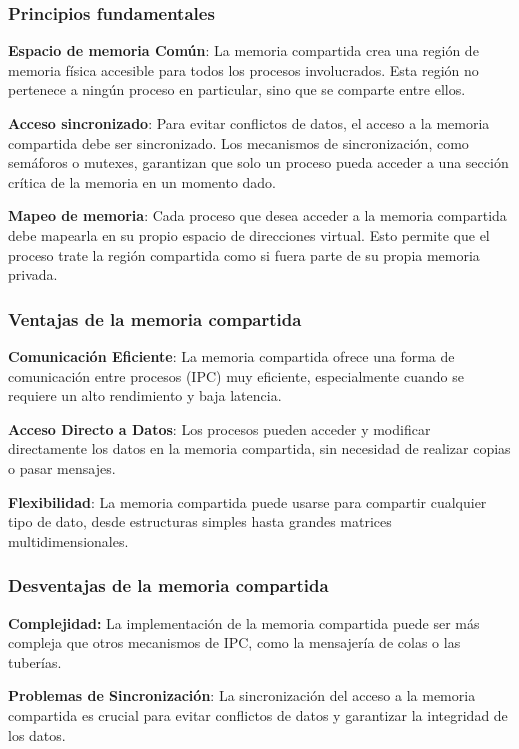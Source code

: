 \subsubsection{Principios fundamentales}

\textbf{Espacio de memoria Común}: La memoria compartida crea una región de memoria física accesible para todos los procesos involucrados. Esta región no pertenece a ningún proceso en particular, sino que se comparte entre ellos.

\textbf{Acceso sincronizado}: Para evitar conflictos de datos, el acceso a la memoria compartida debe ser sincronizado. Los mecanismos de sincronización, como semáforos o mutexes, garantizan que solo un proceso pueda acceder a una sección crítica de la memoria en un momento dado.

\textbf{Mapeo de memoria}: Cada proceso que desea acceder a la memoria compartida debe mapearla en su propio espacio de direcciones virtual. Esto permite que el proceso trate la región compartida como si fuera parte de su propia memoria privada.

\subsubsection{Ventajas de la memoria compartida}

\textbf{Comunicación Eficiente}: La memoria compartida ofrece una forma de comunicación entre procesos (IPC) muy eficiente, especialmente cuando se requiere un alto rendimiento y baja latencia.

\textbf{Acceso Directo a Datos}: Los procesos pueden acceder y modificar directamente los datos en la memoria compartida, sin necesidad de realizar copias o pasar mensajes.

\textbf{Flexibilidad}: La memoria compartida puede usarse para compartir cualquier tipo de dato, desde estructuras simples hasta grandes matrices multidimensionales.

\subsubsection{Desventajas de la memoria compartida}

\textbf{Complejidad:} La implementación de la memoria compartida puede ser más compleja que otros mecanismos de IPC, como la mensajería de colas o las tuberías.

\textbf{Problemas de Sincronización}: La sincronización del acceso a la memoria compartida es crucial para evitar conflictos de datos y garantizar la integridad de los datos.


